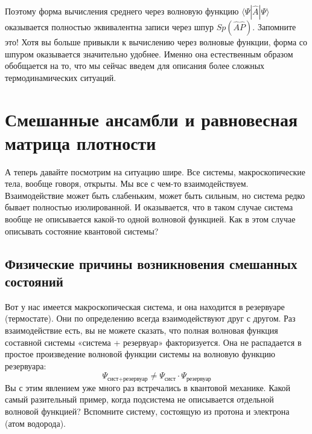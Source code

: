 \documentclass[../general/general]{subfiles}
\begin{document}
Поэтому форма вычисления среднего через волновую функцию $\langle \Psi | \hat{A} | \Psi \rangle$ оказывается полностью эквивалентна записи через шпур $Sp(\hat{A}\hat{P})$. Запомните это! Хотя вы больше привыкли к вычислению через волновые функции, форма со шпуром оказывается значительно удобнее. Именно она естественным образом обобщается на то, что мы сейчас введем для описания более сложных термодинамических ситуаций.

\section{Смешанные ансамбли и равновесная матрица плотности}

А теперь давайте посмотрим на ситуацию шире. Все системы, макроскопические тела, вообще говоря, открыты. Мы все с чем-то взаимодействуем. Взаимодействие может быть слабеньким, может быть сильным, но система редко бывает полностью изолированной. И оказывается, что в таком случае система вообще не описывается какой-то одной волновой функцией. Как в этом случае описывать состояние квантовой системы?

\subsection{Физические причины возникновения смешанных состояний}


Вот у нас имеется макроскопическая система, и она находится в резервуаре (термостате). Они по определению всегда взаимодействуют друг с другом. Раз взаимодействие есть, вы не можете сказать, что полная волновая функция составной системы «система + резервуар» факторизуется. Она не распадается в простое произведение волновой функции системы на волновую функцию резервуара:
\begin{equation}
    \Psi_{\text{сист+резервуар}} \neq \Psi_{\text{сист}} \cdot \Psi_{\text{резервуар}}
\end{equation}
Вы с этим явлением уже много раз встречались в квантовой механике. Какой самый разительный пример, когда подсистема не описывается отдельной волновой функцией? Вспомните систему, состоящую из протона и электрона (атом водорода). 
\end{document}
